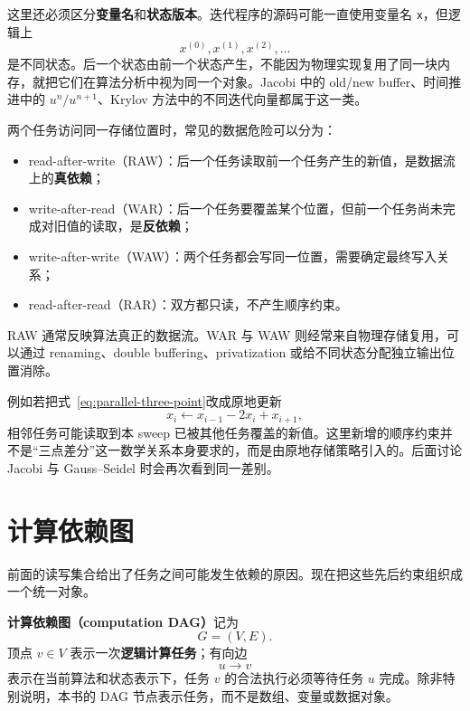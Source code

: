 这里还必须区分\textbf{变量名}和\textbf{状态版本}。迭代程序的源码可能一直使用变量名 \texttt{x}，但逻辑上
\begin{equation}
x^{(0)},x^{(1)},x^{(2)},\ldots
\end{equation}
是不同状态。后一个状态由前一个状态产生，不能因为物理实现复用了同一块内存，就把它们在算法分析中视为同一个对象。Jacobi 中的 old/new buffer、时间推进中的 $u^n/u^{n+1}$、Krylov 方法中的不同迭代向量都属于这一类。

两个任务访问同一存储位置时，常见的数据危险可以分为：
\begin{itemize}
\item read-after-write（RAW）：后一个任务读取前一个任务产生的新值，是数据流上的\textbf{真依赖}；
\item write-after-read（WAR）：后一个任务要覆盖某个位置，但前一个任务尚未完成对旧值的读取，是\textbf{反依赖}；
\item write-after-write（WAW）：两个任务都会写同一位置，需要确定最终写入关系；
\item read-after-read（RAR）：双方都只读，不产生顺序约束。
\end{itemize}

RAW 通常反映算法真正的数据流。WAR 与 WAW 则经常来自物理存储复用，可以通过 renaming、double buffering、privatization 或给不同状态分配独立输出位置消除。

例如若把式~\eqref{eq:parallel-three-point}改成原地更新
\begin{equation}
x_i\leftarrow x_{i-1}-2x_i+x_{i+1},
\end{equation}
相邻任务可能读取到本 sweep 已被其他任务覆盖的新值。这里新增的顺序约束并不是“三点差分”这一数学关系本身要求的，而是由原地存储策略引入的。后面讨论 Jacobi 与 Gauss--Seidel 时会再次看到同一差别。

\section{计算依赖图}

前面的读写集合给出了任务之间可能发生依赖的原因。现在把这些先后约束组织成一个统一对象。

\begin{keybox}
\textbf{计算依赖图（computation DAG）}记为
\begin{equation}
G=(V,E).
\end{equation}
顶点 $v\in V$ 表示一次\textbf{逻辑计算任务}；有向边
\begin{equation}
u\rightarrow v
\end{equation}
表示在当前算法和状态表示下，任务 $v$ 的合法执行必须等待任务 $u$ 完成。除非特别说明，本书的 DAG 节点表示任务，而不是数组、变量或数据对象。
\end{keybox}

